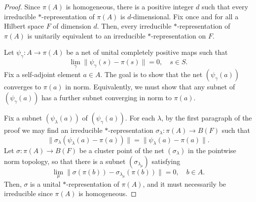 \documentclass[10pt]{amsart}
\theoremstyle{definition}
\begin{document}
\begin{proof}
Since $\pi(A)$ is homogeneous, there is a positive integer $d$ such that every irreducible $*$-representation of $\pi(A)$ is $d$-dimensional. Fix once and for all a Hilbert space $F$ of dimension $d$. Then, every irreducible $*$-representation of $\pi(A)$ is unitarily equivalent to an irreducible $*$-representation on $F$. 

Let $\psi_\gamma:A\to \pi(A)$ be a net of unital completely positive maps such that 
\[
\lim_\gamma\|\psi_\gamma(s)-\pi(s)\|=0, \quad s\in S.
\]
Fix a self-adjoint element $a\in A$. The goal is to show that the net $(\psi_\gamma(a))$ converges to $\pi(a)$ in norm. Equivalently, we must show that any subnet of $(\psi_\gamma(a))$ has a further subnet converging in norm to $\pi(a)$.

Fix  a subnet  $(\psi_\lambda(a))$ of $(\psi_\gamma(a))$. For each $\lambda$, by the first paragraph of the proof we may find an irreducible $*$-representation $\sigma_\lambda:\pi(A)\to B(F)$ such that 
\begin{equation}\label{Eq:normrep}
\|\sigma_\lambda(\psi_\lambda(a)-\pi(a))\|=\|\psi_\lambda(a)-\pi(a)\|.
\end{equation}
Let $\sigma:\pi(A)\to B(F)$ be a cluster point of the net $(\sigma_\lambda)$ in the pointwise norm topology, so that there is a subnet $(\sigma_{\lambda_\mu})$ satisfying
\begin{equation}\label{Eq:conv1}
\lim_\mu\|\sigma(\pi(b))-\sigma_{\lambda_\mu}(\pi(b))\|=0, \quad b\in A.
\end{equation}
Then, $\sigma$ is a unital $*$-representation of $\pi(A)$, and it must necessarily be irreducible since $\pi(A)$ is homogeneous.




\end{proof}
\end{document}
